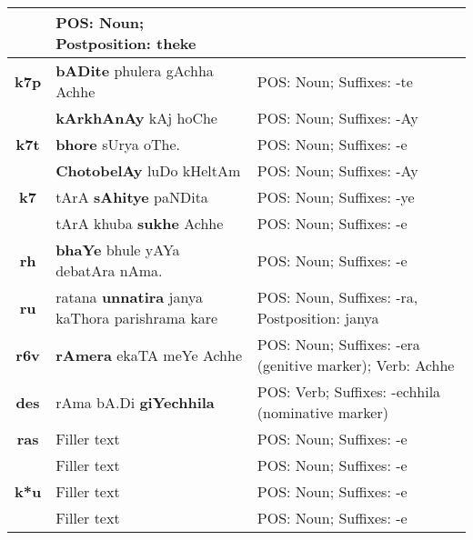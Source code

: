 \documentclass[a4 paper]{article}
\begin{document}
\begin{longtable}{cp{}p{}}
                 & POS: Noun; Postposition: theke\\
    \midrule
    \addlinespace[0.5em]
    \textbf{k7p}
                 & \textbf{bADite} phulera gAchha Achhe
                 & POS: Noun; Suffixes: -te\\
    \addlinespace[0.5em]
                 & \textbf{kArkhAnAy} kAj hoChe
                 & POS: Noun; Suffixes: -Ay\\
    \midrule
    \addlinespace[0.5em]
    \textbf{k7t}
                 & \textbf{bhore} sUrya oThe.
                 & POS: Noun; Suffixes: -e\\
    \addlinespace[0.5em]
                 & \textbf{ChotobelAy} luDo kHeltAm
                 & POS: Noun; Suffixes: -Ay\\
    \midrule
    \addlinespace[0.5em]
    \textbf{k7}
                 & tArA \textbf{sAhitye} paNDita
                 & POS: Noun; Suffixes: -ye\\
    \addlinespace[0.5em]
                 & tArA khuba \textbf{sukhe} Achhe
                 & POS: Noun; Suffixes: -e\\
    \midrule
    \addlinespace[0.5em]
    \textbf{rh}
                 & \textbf{bhaYe} bhule yAYa debatAra nAma.
                 & POS: Noun; Suffixes: -e\\
    \midrule
    \addlinespace[0.5em]
    \textbf{ru}
                 & ratana \textbf{unnatira} janya kaThora parishrama kare
                 & POS: Noun, Suffixes: -ra, Postposition: janya\\
    \midrule
    \addlinespace[0.5em]
    \textbf{r6v}
                 & \textbf{rAmera} ekaTA meYe Achhe
                 & POS: Noun; Suffixes: -era (genitive marker); Verb: Achhe\\
    \midrule
    \addlinespace[0.5em]
    \textbf{des}
                 & rAma bA.Di \textbf{giYechhila}
                 & POS: Verb; Suffixes: -echhila (nominative marker)\\
    \midrule
    \addlinespace[0.5em]
    \textbf{ras}
                 & Filler text
                 & POS: Noun; Suffixes: -e\\
    \addlinespace[0.5em]
                 & Filler text
                 & POS: Noun; Suffixes: -e\\
    \midrule
    \addlinespace[0.5em]
    \textbf{k*u}
                 & Filler text
                 & POS: Noun; Suffixes: -e\\
    \addlinespace[0.5em]
                 & Filler text
                 & POS: Noun; Suffixes: -e\\

\end{longtable}
\end{document}
